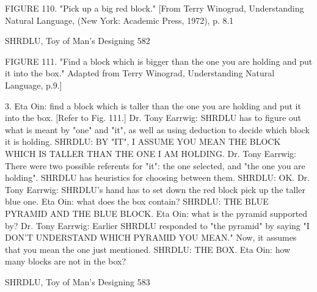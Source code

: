 {FIGURE 110. "Pick up a big red block." [From Terry Winograd, Understanding Natural
  Language, (New York: Academic Press, 1972), p. 8.1




   SHRDLU, Toy of Man's Designing                                                          582

FIGURE 111. "Find a block which is bigger than the one you are holding and put it into the
  box." Adapted from Terry Winograd, Understanding Natural Language, p.9.]

3. Eta Oin: find a block which is taller than the one you are holding and put it into the box.
   [Refer to Fig. 111.]
   Dr. Tony Earrwig: SHRDLU has to figure out what is meant by "one" and "it", as well as
   using deduction to decide which block it is holding.
   SHRDLU: BY "IT", I ASSUME YOU MEAN THE BLOCK WHICH IS TALLER
   THAN THE ONE I AM HOLDING.
   Dr. Tony Earrwig: There were two possible referents for "it": the one selected, and "the
   one you are holding". SHRDLU has heuristics for choosing between them.
   SHRDLU: OK.
   Dr. Tony Earrwig: SHRDLU's hand has to set down the red block pick up the taller blue
   one.
Eta Oin: what does the box contain?
   SHRDLU: THE BLUE PYRAMID AND THE BLUE BLOCK.
Eta Oin: what is the pyramid supported by?
   Dr. Tony Earrwig: Earlier SHRDLU responded to "the pyramid" by saying "I DON'T
   UNDERSTAND WHICH PYRAMID YOU MEAN." Now, it assumes that you mean the
   one just mentioned.
   SHRDLU: THE BOX.
Eta Oin: how many blocks are not in the box?




  SHRDLU, Toy of Man's Designing                                                          583

}
